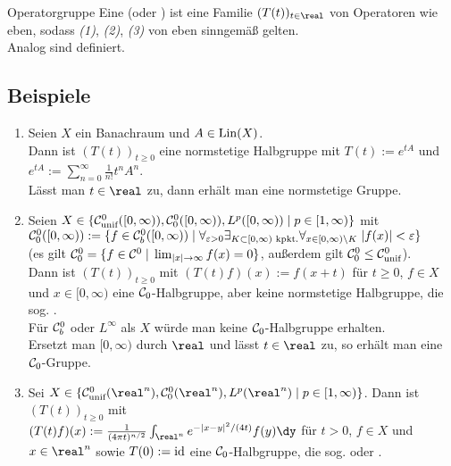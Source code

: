 \begin{Def}{Operatorgruppe}
    Eine  (oder ) ist
    eine Familie $(T(t))_{t \in \real}$ von Operatoren wie eben,
    sodass \emph{(1)}, \emph{(2)}, \emph{(3)} von eben sinngemäß gelten.\\
    Analog sind  definiert.
\end{Def}

\pagebreak

\subsection{%
    Beispiele%
}

\begin{Bsp}
    \begin{enumerate}[label=\emph{(\alph*)}]
        \item
        Seien $X$ ein Banachraum und $A \in \operatorname{Lin}(X)$.\\
        Dann ist $(T(t))_{t \ge 0}$ eine normstetige Halbgruppe
        mit $T(t) := e^{tA}$ und $e^{tA} := \sum_{n=0}^\infty \frac{1}{n!} t^n A^n$.\\
        Lässt man $t \in \real$ zu, dann erhält man eine normstetige Gruppe.
        
        \item
        Seien $X \in \{\mathcal{C}^0_{\text{unif}}([0, \infty)), \mathcal{C}^0_0([0, \infty)), L^p([0,\infty)) \;|\;
        p \in [1, \infty)\}$ mit\\
        $\mathcal{C}^0_0([0, \infty)) := \{f \in \mathcal{C}^0_b([0, \infty)) \;|\; \forall_{\varepsilon>0}
        \exists_{K \subset [0, \infty) \text{ kpkt.}} \forall_{x \in [0, \infty) \setminus K}\;
        |f(x)| < \varepsilon\}$\\
        (es gilt $\mathcal{C}^0_0 = \{f \in \mathcal{C}^0 \;|\; \lim_{|x| \to \infty} f(x) = 0\}$,
        außerdem gilt $\mathcal{C}^0_0 \le \mathcal{C}^0_{\text{unif}}$).\\
        Dann ist $(T(t))_{t \ge 0}$ mit $(T(t) f)(x) := f(x + t)$
        für $t \ge 0$, $f \in X$ und $x \in [0, \infty)$
        eine $\mathcal{C}_0$-Halbgruppe, aber keine normstetige Halbgruppe,
        die sog. .\\
        Für $\mathcal{C}^0_b$ oder $L^\infty$ als $X$ würde man keine $\mathcal{C}_0$-Halbgruppe erhalten.\\
        Ersetzt man $[0, \infty)$ durch $\real$ und lässt $t \in \real$ zu,
        so erhält man eine $\mathcal{C}_0$-Gruppe.
        
        \item
        Sei $X \in \{\C^0_\unif(\real^n), \C^0_0(\real^n), L^p(\real^n) \;|\; p \in [1, \infty)\}$.
        Dann ist $(T(t))_{t \ge 0}$ mit\\
        $(T(t) f)(x) := \frac{1}{(4\pi t)^{n/2}} \int_{\real^n} e^{-|x-y|^2/(4t)} f(y)\dy$
        für $t > 0$, $f \in X$ und $x \in \real^n$ sowie $T(0) := \text{id}$
        eine $\mathcal{C}_0$-Halbgruppe, die sog.  oder
        .
    \end{enumerate}
\end{Bsp}

